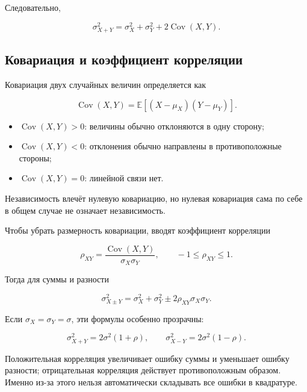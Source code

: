 \documentclass[
  russian,
  12pt,
  a4paper,
  a4paper,
  openany]{scrbook}
\providecommand{\tightlist}{%
  \setlength{\itemsep}{0pt}\setlength{\parskip}{0pt}}
\begin{document}
Следовательно,

\[
\boxed{
\sigma_{X+Y}^2
=\sigma_X^2+\sigma_Y^2+2\operatorname{Cov}(X,Y).
}
\]

\subsection{Ковариация и коэффициент
корреляции}\label{ux43aux43eux432ux430ux440ux438ux430ux446ux438ux44f-ux438-ux43aux43eux44dux444ux444ux438ux446ux438ux435ux43dux442-ux43aux43eux440ux440ux435ux43bux44fux446ux438ux438}

\begin{booknote}

Ковариация двух случайных величин определяется как

\[
\boxed{
\operatorname{Cov}(X,Y)
=\mathbb E[(X-\mu_X)(Y-\mu_Y)].
}
\]

\begin{itemize}
\tightlist
\item
  \(\operatorname{Cov}(X,Y)>0\): величины обычно отклоняются в одну
  сторону;
\item
  \(\operatorname{Cov}(X,Y)<0\): отклонения обычно направлены в
  противоположные стороны;
\item
  \(\operatorname{Cov}(X,Y)=0\): линейной связи нет.
\end{itemize}

Независимость влечёт нулевую ковариацию, но нулевая ковариация сама по
себе в общем случае не означает независимость.

\end{booknote}

Чтобы убрать размерность ковариации, вводят коэффициент корреляции

\[
\boxed{
\rho_{XY}
=\frac{\operatorname{Cov}(X,Y)}{\sigma_X\sigma_Y},
\qquad
-1\le\rho_{XY}\le1.
}
\]

Тогда для суммы и разности

\[
\boxed{
\sigma_{X\pm Y}^2
=\sigma_X^2+\sigma_Y^2
\pm2\rho_{XY}\sigma_X\sigma_Y.
}
\]

Если \(\sigma_X=\sigma_Y=\sigma\), эти формулы особенно прозрачны:

\[
\sigma_{X+Y}^2=2\sigma^2(1+\rho),
\qquad
\sigma_{X-Y}^2=2\sigma^2(1-\rho).
\]

Положительная корреляция увеличивает ошибку суммы и уменьшает ошибку
разности; отрицательная корреляция действует противоположным образом.
Именно из-за этого нельзя автоматически складывать все ошибки в
квадратуре.
\end{document}
